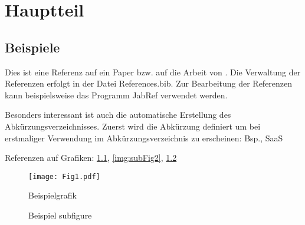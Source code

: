 
\chapter{Hauptteil}
\label{chap:Hauptteil}


\section{Beispiele}
Dies  ist eine Referenz auf ein Paper \citep{Webster2002} bzw. auf die Arbeit von \cite{Webster2002}. Die Verwaltung der Referenzen erfolgt in der Datei References.bib. Zur Bearbeitung der Referenzen kann beispielsweise das Programm JabRef verwendet werden.

Besonders interessant ist auch die automatische Erstellung des Abkürzungsverzeichnisses. Zuerst wird die Abkürzung definiert um bei erstmaliger Verwendung im Abkürzungsverzeichnis zu erscheinen: \ac{Bsp.}, \ac{SaaS}

Referenzen auf Grafiken: \ref{fig:Fig1}, \ref{img:subFig2}, \ref{img:subFigs}

\begin{figure}
  \centering
  \texttt{[image: Fig1.pdf]}
  \caption{Beispielgrafik}
  \label{fig:Fig1}
\end{figure}


\begin{figure}
  \centering
  \hfill
  \hfill
  \caption{Beispiel subfigure}
  \label{img:subFigs}
\end{figure}



\lstset{language=JAVA, breaklines=true, tabsize=2}



